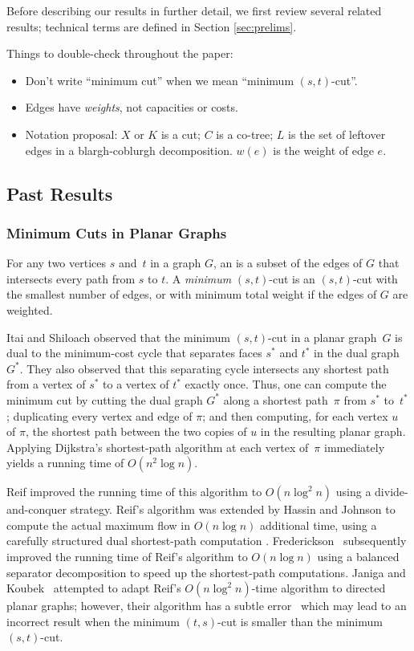 \documentclass[11pt,twoside]{article}
\begin{document}
Before describing our results in further detail, we first review several related results; technical terms are defined in Section \ref{sec:prelims}.

\begin{TODO}
\noindent
Things to double-check throughout the paper:
\begin{itemize}\itemsep0pt
\item
Don’t write “minimum cut” when we mean “minimum $(s,t)$-cut”.
\item
Edges have \emph{weights}, not capacities or costs.
\item
Notation proposal: $X$ or $K$ is a cut; $C$ is a co-tree; $L$ is the set of leftover edges in a blargh-coblurgh decomposition.  $w(e)$ is the weight of edge $e$.
\end{itemize}
\end{TODO}

\subsection{Past Results}

\subsubsection*{Minimum Cuts in Planar Graphs}

For any two vertices $s$ and~$t$ in a graph $G$, an  is a subset of the edges of $G$ that intersects every path from $s$ to $t$.  A \emph{minimum} $(s,t)$-cut is an $(s,t)$-cut with the smallest number of edges, or with minimum total weight if the edges of $G$ are weighted.

Itai and Shiloach \cite{is-mfpn-79} observed that the minimum $(s,t)$-cut in a planar graph~$G$ is dual to the minimum-cost cycle that separates faces $s^*$ and $t^*$ in the dual graph $G^*$.  They also observed that this separating cycle intersects any shortest path from a vertex of $s^*$ to a vertex of $t^*$ exactly once.  Thus, one can compute the minimum cut by cutting the dual graph $G^*$ along a shortest path~$\pi$ from $s^*$ to~$t^*$; duplicating every vertex and edge of $\pi$; and then computing, for each vertex $u$ of $\pi$, the shortest path between the two copies of $u$ in the resulting planar graph.  Applying Dijkstra's shortest-path algorithm at each vertex of~$\pi$ immediately yields a running time of $O(n^2\log n)$.

Reif \cite{r-mstcp-83} improved the running time of this algorithm to $O(n\log^2 n)$ using a divide-and-conquer strategy.  Reif's algorithm was extended by Hassin and Johnson to compute the actual maximum flow in $O(n\log n)$ additional time, using a carefully structured dual shortest-path computation \cite{hj-oamfu-85}.  Frederickson~\cite{f-faspp-87} subsequently improved the running time of Reif's algorithm to $O(n\log n)$ using a balanced separator decomposition to speed up the shortest-path computations.  Janiga and Koubek~\cite{jk-mcdpn-92} attempted to adapt Reif's $O(n\log^2 n)$-time algorithm to directed planar graphs; however, their  algorithm has a subtle error~\cite{kn-mcupg-11} which may lead to an incorrect result when the minimum $(t,s)$-cut is smaller than the minimum $(s,t)$-cut.
\end{document}
